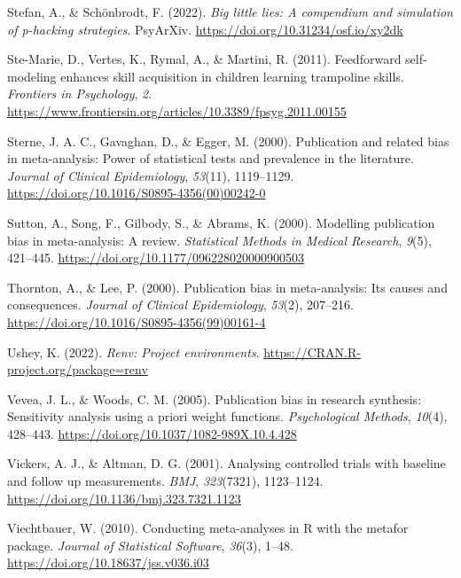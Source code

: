 \documentclass[
  doc, donotrepeattitle,floatsintext]{apa7}
\newlength{\cslhangindent}
\newlength{\cslentryspacingunit} %
\newenvironment{CSLReferences}[2] %
 {%
  \setlength{\parindent}{0pt}
  \ifodd #1
  \let\oldpar\par
  \def\par{\hangindent=\cslhangindent\oldpar}
  \fi
  \setlength{\parskip}{#2\cslentryspacingunit}
 }%
 {}
\begin{document}
\begin{CSLReferences}{1}{0}
\leavevmode{}%
Stefan, A., \& Schönbrodt, F. (2022). \emph{Big little lies: A compendium and simulation of p-hacking strategies}. {PsyArXiv}. \url{https://doi.org/10.31234/osf.io/xy2dk}

\leavevmode{}%
Ste-Marie, D., Vertes, K., Rymal, A., \& Martini, R. (2011). Feedforward self-modeling enhances skill acquisition in children learning trampoline skills. \emph{Frontiers in Psychology}, \emph{2}. \url{https://www.frontiersin.org/articles/10.3389/fpsyg.2011.00155}

\leavevmode{}%
Sterne, J. A. C., Gavaghan, D., \& Egger, M. (2000). Publication and related bias in meta-analysis: Power of statistical tests and prevalence in the literature. \emph{Journal of Clinical Epidemiology}, \emph{53}(11), 1119--1129. \url{https://doi.org/10.1016/S0895-4356(00)00242-0}

\leavevmode{}%
Sutton, A., Song, F., Gilbody, S., \& Abrams, K. (2000). Modelling publication bias in meta-analysis: A review. \emph{Statistical Methods in Medical Research}, \emph{9}(5), 421--445. \url{https://doi.org/10.1177/096228020000900503}

\leavevmode{}%
Thornton, A., \& Lee, P. (2000). Publication bias in meta-analysis: Its causes and consequences. \emph{Journal of Clinical Epidemiology}, \emph{53}(2), 207--216. \url{https://doi.org/10.1016/S0895-4356(99)00161-4}

\leavevmode{}%
Ushey, K. (2022). \emph{Renv: Project environments}. \url{https://CRAN.R-project.org/package=renv}

\leavevmode{}%
Vevea, J. L., \& Woods, C. M. (2005). Publication bias in research synthesis: Sensitivity analysis using a priori weight functions. \emph{Psychological Methods}, \emph{10}(4), 428--443. \url{https://doi.org/10.1037/1082-989X.10.4.428}

\leavevmode{}%
Vickers, A. J., \& Altman, D. G. (2001). Analysing controlled trials with baseline and follow up measurements. \emph{BMJ}, \emph{323}(7321), 1123--1124. \url{https://doi.org/10.1136/bmj.323.7321.1123}

\leavevmode{}%
Viechtbauer, W. (2010). Conducting meta-analyses in {R} with the {metafor} package. \emph{Journal of Statistical Software}, \emph{36}(3), 1--48. \url{https://doi.org/10.18637/jss.v036.i03}


\end{CSLReferences}
\end{document}
